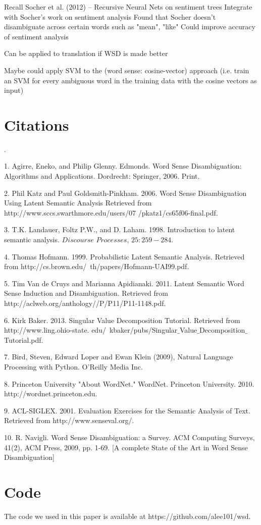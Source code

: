 \documentclass[10pt, letterpaper]{article}
\begin{document}
	Recall Socher et al. (2012) -- Recursive Neural Nets on sentiment trees
	Integrate with Socher's work on sentiment analysis
	Found that Socher doesn't disambiguate across certain words such as "mean", "like"
	Could improve accuracy of sentiment analysis	

	Can be applied to translation if WSD is made better

	Maybe could apply SVM to the (word sense: cosine-vector) approach (i.e. train an SVM 
	for every ambiguous word in the training data with the cosine vectors as input)

	\section{Citations} 
	.

	1. Agirre, Eneko, and Philip Glenny. Edmonds. Word Sense Disambiguation: Algorithms and Applications. Dordrecht: Springer, 2006. Print.

	2. Phil Katz and Paul Goldsmith-Pinkham. 2006. Word Sense Disambiguation Using Latent Semantic Analysis Retrieved from http://www.sccs.swarthmore.edu/users/07 /pkatz1/cs65f06-final.pdf.

	3. T.K. Landauer, Foltz P.W., and D. Laham. 1998. Introduction to latent semantic analysis. $\textit{Discourse Processes}$, $25:259-284$. 

	4. Thomas Hofmann. 1999. Probabilistic Latent Semantic Analysis. Retrieved from http://cs.brown.edu/~th/papers/Hofmann-UAI99.pdf. 

	5. Tim Van de Cruys and Marianna Apidianaki. 2011. Latent Semantic Word Sense Induction and Disambiguation. Retrieved from http://aclweb.org/anthology//P/P11/P11-1148.pdf. 

	6. Kirk Baker. 2013. Singular Value Decomposition Tutorial. Retrieved from http://www.ling.ohio-state. edu/~kbaker/pubs/Singular$\_$Value$\_$Decomposition$\_$Tutorial.pdf. 

	7. Bird, Steven, Edward Loper and Ewan Klein (2009), Natural Language Processing with Python. O’Reilly Media Inc.

	8. Princeton University "About WordNet." WordNet. Princeton University. 2010. http://wordnet.princeton.edu. 

	9. ACL-SIGLEX. 2001. Evaluation Exercises for the Semantic Analysis of Text. Retrieved from http://www.senseval.org/. 

	10. R. Navigli. Word Sense Disambiguation: a Survey. ACM Computing Surveys, 41(2), ACM Press, 2009, pp. 1-69. [A complete State of the Art in Word Sense Disambiguation]

	\section{Code}

	The code we used in this paper is available at https://github.com/alee101/wsd. 




 
\end{document}
